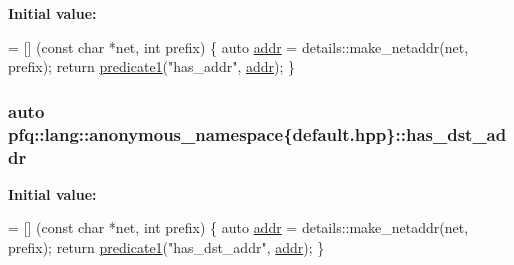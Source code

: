{\bfseries Initial value\+:}
\begin{DoxyCode}
= [] (\textcolor{keyword}{const} \textcolor{keywordtype}{char} *net, \textcolor{keywordtype}{int} prefix)
        \{
            \textcolor{keyword}{auto} \hyperlink{namespacepfq_1_1lang_1_1anonymous__namespace_02default_8hpp_03_a13cabe468839119d8d68540e3c60718b}{addr} = details::make\_netaddr(net, prefix);
            \textcolor{keywordflow}{return} \hyperlink{namespacepfq_1_1lang_a3e018f096545ca95a68e67027c8e3144}{predicate1}(\textcolor{stringliteral}{"has\_addr"}, \hyperlink{namespacepfq_1_1lang_1_1anonymous__namespace_02default_8hpp_03_a13cabe468839119d8d68540e3c60718b}{addr});
        \}
\end{DoxyCode}
\hypertarget{namespacepfq_1_1lang_1_1anonymous__namespace_02default_8hpp_03_a0a53822af0ed8ea341f16a1da5ea83e3}{
\subsubsection[{has\+\_\+dst\+\_\+addr}]{\setlength{\rightskip}{0pt plus 5cm}auto pfq\+::lang\+::anonymous\+\_\+namespace\{default.\+hpp\}\+::has\+\_\+dst\+\_\+addr}}\label{namespacepfq_1_1lang_1_1anonymous__namespace_02default_8hpp_03_a0a53822af0ed8ea341f16a1da5ea83e3}
{\bfseries Initial value\+:}
\begin{DoxyCode}
= [] (\textcolor{keyword}{const} \textcolor{keywordtype}{char} *net, \textcolor{keywordtype}{int} prefix)
        \{
            \textcolor{keyword}{auto} \hyperlink{namespacepfq_1_1lang_1_1anonymous__namespace_02default_8hpp_03_a13cabe468839119d8d68540e3c60718b}{addr} = details::make\_netaddr(net, prefix);
            \textcolor{keywordflow}{return} \hyperlink{namespacepfq_1_1lang_a3e018f096545ca95a68e67027c8e3144}{predicate1}(\textcolor{stringliteral}{"has\_dst\_addr"}, \hyperlink{namespacepfq_1_1lang_1_1anonymous__namespace_02default_8hpp_03_a13cabe468839119d8d68540e3c60718b}{addr});
        \}
\end{DoxyCode}
